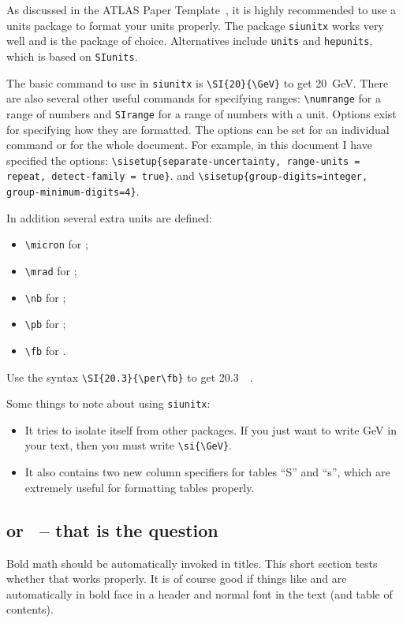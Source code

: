 \documentclass[koma,UKenglish]{style/atlasdoc}
\begin{document}
As discussed in the ATLAS Paper Template~\cite{atlas-paper},
it is highly recommended to use a units package to format your units properly.
The package \texttt{siunitx} works very well and is the package of choice.
Alternatives include \texttt{units} and \texttt{hepunits},
which is based on \texttt{SIunits}.

The basic command to use in \texttt{siunitx} is \verb|\SI{20}{\GeV}| to get
\SI{20}{\GeV}. 
There are also several other useful commands for specifying ranges:
\verb|\numrange| for a range of numbers and \verb|SIrange| for a range of numbers with a unit. 
Options exist for specifying how they are formatted.
The options can be set for an individual command or for the whole document.
For example, in this document I have specified the options:
\verb|\sisetup{separate-uncertainty, range-units = repeat, detect-family = true}|.
and
\verb|\sisetup{group-digits=integer, group-minimum-digits=4}|.

In addition several extra units are defined:
\begin{itemize}
\item \verb|\micron| for \si{\micron};
\item \verb|\mrad| for \si{\mrad};
\item \verb|\nb| for \si{\nb};
\item \verb|\pb| for \si{\pb};
\item \verb|\fb| for \si{\fb}.
\end{itemize}
Use the syntax \verb|\SI{20.3}{\per\fb}| to get \SI{20.3}{\per\fb}.

Some things to note about using \texttt{siunitx}:
\begin{itemize}
\item It tries to isolate itself from other packages.
	If you just want to write \si{\GeV} in your text,
	then you must write \verb|\si{\GeV}|.
\item It also contains two new column specifiers for tables ``S'' and ``s'',
	which are extremely useful for formatting tables properly.
\end{itemize}

\subsection{\pT or \ET\ -- that is the question}

Bold math should be automatically invoked in titles.
This short section tests whether that works properly.
It is of course good if things like \pT and \ET are automatically in bold face in
a header and normal font in the text (and table of contents).
\end{document}
